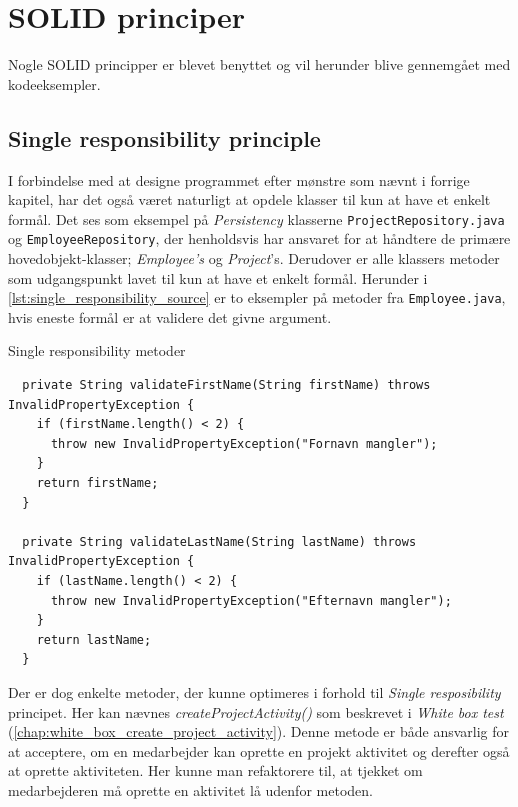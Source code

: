 \section{SOLID principer} \label{chap:solid}
Nogle SOLID principper er blevet benyttet og vil herunder blive gennemgået med kodeeksempler.
\subsection{Single responsibility principle} \label{sec:solid_s}
I forbindelse med at designe programmet efter mønstre som nævnt i forrige kapitel, har det også været naturligt at opdele klasser til kun at have et enkelt formål. Det ses som eksempel på \textit{Persistency} klasserne \texttt{ProjectRepository.java} og \texttt{EmployeeRepository}, der henholdsvis har ansvaret for at håndtere de primære hovedobjekt-klasser; \textit{Employee's} og \textit{Project}'s.
Derudover er alle klassers metoder som udgangspunkt lavet til kun at have et enkelt formål. Herunder i \cref{lst:single_responsibility_source} er to eksempler på metoder fra \texttt{Employee.java}, hvis eneste formål er at validere det givne argument.
\begin{listing}[H]
  \centering
  \caption{Single responsibility metoder}\label{lst:single_responsibility_source}
  \begin{verbatim}
  private String validateFirstName(String firstName) throws InvalidPropertyException {
    if (firstName.length() < 2) {
      throw new InvalidPropertyException("Fornavn mangler");
    }
    return firstName;
  }

  private String validateLastName(String lastName) throws InvalidPropertyException {
    if (lastName.length() < 2) {
      throw new InvalidPropertyException("Efternavn mangler");
    }
    return lastName;
  }

    \end{verbatim}
\end{listing}
Der er dog enkelte metoder, der kunne optimeres i forhold til \textit{Single resposibility} principet. Her kan nævnes \textit{createProjectActivity()} som beskrevet i \textit{White box test} (\cref{chap:white_box_create_project_activity}). Denne metode er både ansvarlig for at acceptere, om en medarbejder kan oprette en projekt aktivitet og derefter også at oprette aktiviteten. Her kunne man refaktorere til, at tjekket om medarbejderen må oprette en aktivitet lå udenfor metoden.
